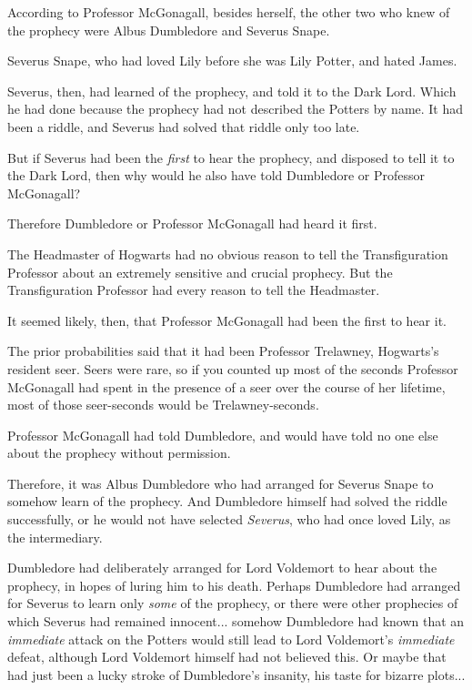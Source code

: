 According to Professor McGonagall, besides herself, the other two who
knew of the prophecy were Albus Dumbledore and Severus Snape.

Severus Snape, who had loved Lily before she was Lily Potter, and hated
James.

Severus, then, had learned of the prophecy, and told it to the Dark
Lord. Which he had done because the prophecy had not described the
Potters by name. It had been a riddle, and Severus had solved that
riddle only too late.

But if Severus had been the \emph{first} to hear the prophecy, and
disposed to tell it to the Dark Lord, then why would he also have told
Dumbledore or Professor McGonagall?

Therefore Dumbledore or Professor McGonagall had heard it first.

The Headmaster of Hogwarts had no obvious reason to tell the
Transfiguration Professor about an extremely sensitive and crucial
prophecy. But the Transfiguration Professor had every reason to tell the
Headmaster.

It seemed likely, then, that Professor McGonagall had been the first to
hear it.

The prior probabilities said that it had been Professor Trelawney,
Hogwarts's resident seer. Seers were rare, so if you counted up most of
the seconds Professor McGonagall had spent in the presence of a seer
over the course of her lifetime, most of those seer-seconds would be
Trelawney-seconds.

Professor McGonagall had told Dumbledore, and would have told no one
else about the prophecy without permission.

Therefore, it was Albus Dumbledore who had arranged for Severus Snape to
somehow learn of the prophecy. And Dumbledore himself had solved the
riddle successfully, or he would not have selected \emph{Severus}, who
had once loved Lily, as the intermediary.

Dumbledore had deliberately arranged for Lord Voldemort to hear about
the prophecy, in hopes of luring him to his death. Perhaps Dumbledore
had arranged for Severus to learn only \emph{some} of the prophecy, or
there were other prophecies of which Severus had remained
innocent... somehow Dumbledore had known that an \emph{immediate}
attack on the Potters would still lead to Lord Voldemort's
\emph{immediate} defeat, although Lord Voldemort himself had not
believed this. Or maybe that had just been a lucky stroke of
Dumbledore's insanity, his taste for bizarre plots...

